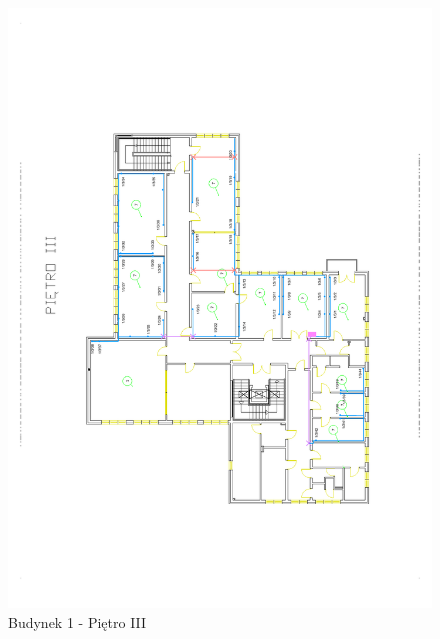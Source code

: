 \begin{figure}[H]
  \begin{center}
    \includegraphics[width=\textwidth]{img/s/b1-3.pdf}
    \caption{Budynek 1 - Piętro III}
  \end{center}
\end{figure}

